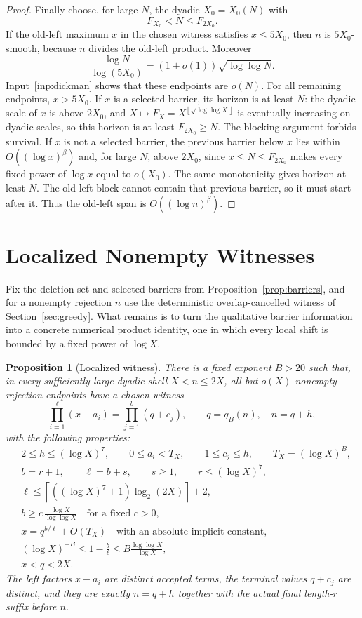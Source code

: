 \documentclass[11pt]{article}
\newtheorem{proposition}[theorem]{Proposition}
\theoremstyle{definition}
\newcommand{\floor}[1]{\left\lfloor #1\right\rfloor}
\newcommand{\ceil}[1]{\left\lceil #1\right\rceil}
\newcommand{\1}{\mathbf 1}
\begin{document}
\begin{proof}
Finally choose, for large \(N\), the dyadic \(X_0=X_0(N)\) with
\[
  F_{X_0}<N\le F_{2X_0}.
\]
If the old-left maximum \(x\) in the chosen witness satisfies \(x\le5X_0\),
then \(n\) is \(5X_0\)-smooth, because \(n\) divides the old-left product.
Moreover
\[
  \frac{\log N}{\log(5X_0)}
  =(1+o(1))\sqrt{\log\log N}.
\]
Input~\ref{inp:dickman} shows that these endpoints are \(o(N)\).  For all
remaining endpoints, \(x>5X_0\).  If \(x\) is a selected barrier, its horizon
is at least \(N\): the dyadic scale of \(x\) is above \(2X_0\), and
\(X\mapsto F_X=X^{\floor{\sqrt{\log\log X}}}\) is eventually increasing on
dyadic scales, so this horizon is at least \(F_{2X_0}\ge N\).  The blocking
argument forbids survival.  If \(x\) is not a selected barrier, the previous
barrier below \(x\) lies within \(O((\log x)^\beta)\) and, for large \(N\),
above \(2X_0\), since \(x\le N\le F_{2X_0}\) makes every fixed power of
\(\log x\) equal to \(o(X_0)\).  The same monotonicity gives horizon at least
\(N\).  The old-left block cannot contain that previous barrier, so it must
start after it.  Thus the old-left span is \(O((\log n)^\beta)\).
\end{proof}

\section{Localized Nonempty Witnesses}\label{sec:localization}

Fix the deletion set and selected barriers from Proposition~\ref{prop:barriers},
and for a nonempty rejection \(n\) use the deterministic overlap-cancelled
witness of Section~\ref{sec:greedy}.  What remains is to turn the qualitative
barrier information into a concrete numerical product identity, one in which
every local shift is bounded by a fixed power of \(\log X\).

\begin{proposition}[Localized witness]\label{prop:localized}
There is a fixed exponent \(B>20\) such that, in every sufficiently large
dyadic shell \(X<n\le2X\), all but \(o(X)\) nonempty rejection endpoints have
a chosen witness
\[
  \prod_{i=1}^{\ell}(x-a_i)=\prod_{j=1}^{b}(q+c_j),
  \qquad q=q_B(n),\quad n=q+h,
\]
with the following properties:
\begin{align*}
&2\le h\le(\log X)^7,\qquad
0\le a_i<T_X,\qquad 1\le c_j\le h,\qquad T_X=(\log X)^B,\\
&b=r+1,\qquad \ell=b+s,\qquad s\ge1,\qquad r\le(\log X)^7,\\
&\ell\le \ceil{((\log X)^7+1)\log_2(2X)}+2,\\
&b\ge c\,\frac{\log X}{\log\log X}\quad\text{for a fixed }c>0,\\
&x=q^{b/\ell}+O(T_X)\quad\text{with an absolute implicit constant},\\
&(\log X)^{-B}\le 1-\frac b\ell\le B\frac{\log\log X}{\log X},\\
&x<q<2X.
\end{align*}
The left factors \(x-a_i\) are distinct accepted terms, the terminal values
\(q+c_j\) are distinct, and they are exactly \(n=q+h\) together with the
actual final length-\(r\) suffix before \(n\).
\end{proposition}
\end{document}
